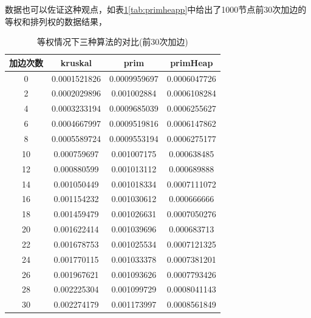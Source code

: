 \documentclass[UTF8]{ctexart}
\begin{document}
数据也可以佐证这种观点，如表\ref{tab:primheap}\ref{tab:primheapp}中给出了1000节点前30次加边的等权和排列权的数据结果，
\begin{table}[htbp]
    \centering
    \begin{tabular}{|c|c|c|c|}
    \hline
    加边次数 & kruskal & prim & primHeap \\ \hline
0    & 0.0001521826            & 0.0009959697         & 0.0006047726             \\ \hline
2    & 0.0002029896            & 0.001002884          & 0.0006108284             \\ \hline
4    & 0.0003233194            & 0.0009685039         & 0.0006255627             \\ \hline
6    & 0.0004667997            & 0.0009519816         & 0.0006147862             \\ \hline
8    & 0.0005589724            & 0.0009553194         & 0.0006275177             \\ \hline
10   & 0.000759697             & 0.001007175          & 0.000638485              \\ \hline
12   & 0.000880599             & 0.001013112          & 0.000689888              \\ \hline
14   & 0.001050449             & 0.001018334          & 0.0007111072             \\ \hline
16   & 0.001154232             & 0.001030612          & 0.000666666              \\ \hline
18   & 0.001459479             & 0.001026631          & 0.0007050276             \\ \hline
20   & 0.001622414             & 0.001039696          & 0.000683713              \\ \hline
22   & 0.001678753             & 0.001025534          & 0.0007121325             \\ \hline
24   & 0.001770115             & 0.001033378          & 0.0007381201             \\ \hline
26   & 0.001967621             & 0.001093626          & 0.0007793426             \\ \hline
28   & 0.002225304             & 0.001099729          & 0.0008041143             \\ \hline
30   & 0.002274179             & 0.001173997          & 0.0008561849             \\ \hline
    \end{tabular}
    \caption{等权情况下三种算法的对比(前30次加边)}
    \label{tab:primheap}
\end{table}
\end{document}
